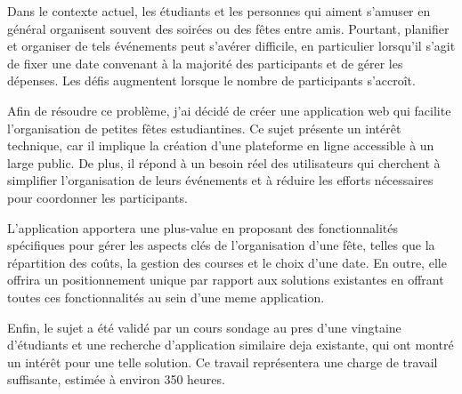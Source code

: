 
Dans le contexte actuel, les étudiants et les personnes qui aiment s'amuser en général organisent souvent des soirées ou des fêtes entre amis.
Pourtant, planifier et organiser de tels événements peut s'avérer difficile, en particulier lorsqu'il s'agit de fixer une date convenant à la majorité des participants et de gérer les dépenses.
Les défis augmentent lorsque le nombre de participants s'accroît.

Afin de résoudre ce problème, j'ai décidé de créer une application web qui facilite l'organisation de petites fêtes estudiantines.
Ce sujet présente un intérêt technique, car il implique la création d'une plateforme en ligne accessible à un large public.
De plus, il répond à un besoin réel des utilisateurs qui cherchent à simplifier l'organisation de leurs événements et à réduire les efforts nécessaires pour coordonner les participants.

L'application apportera une plus-value en proposant des fonctionnalités spécifiques pour gérer les aspects clés de l'organisation d'une fête, telles que la répartition des coûts,
la gestion des courses et le choix d'une date.
En outre, elle offrira un positionnement unique par rapport aux solutions existantes en offrant toutes ces fonctionnalités au sein d'une meme application.

Enfin, le sujet a été validé par un cours sondage au pres d'une vingtaine d'étudiants et une recherche d'application similaire deja existante, qui ont montré un intérêt pour une telle solution.
Ce travail représentera une charge de travail suffisante, estimée à environ 350 heures.